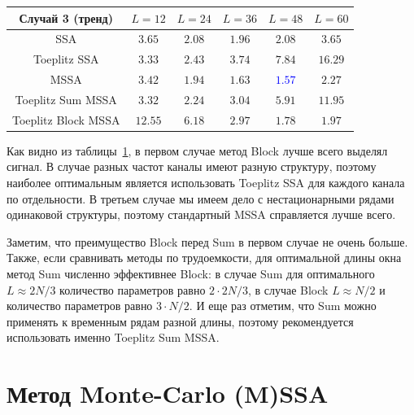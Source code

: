 \documentclass[specialist,
substylefile = spbu_report.rtx,
subf,href,colorlinks=true, 12pt]{disser}
\theoremstyle{definition}
\begin{document}
\begin{table}[h]
\begin{tabular}{cccccc}
			\hhline{======}
			Случай 3 (тренд)                 & $L=12$  & $L=24$                     & $L=36$                     & $L=48$                     & $L=60$          \\
			\hline
			SSA                              & $3.65$  & $2.08$                     & $\mathbf{1.96}$            & $2.08$                     & $3.65$          \\
			\hline
			Toeplitz SSA                     & $3.33$  & $\mathbf{2.43}$            & $3.74$                     & $7.84$                     & $16.29$         \\
			\hline
			MSSA                             & $3.42$  & $1.94$                     & $1.63$                     & \textcolor{blue}{${\mathbf{1.57}}$} & $2.27$          \\
			\hline
			Toeplitz Sum MSSA                & $3.32$  & $\mathbf{2.24}$            & $3.04$                     & $5.91$                     & $11.95$         \\
			\hline
			Toeplitz Block MSSA              & $12.55$ & $6.18$                     & $2.97$                     & $\mathbf{1.78}$            & $1.97$          \\
			\hline
		\end{tabular}
	\label{tab:mse}
\end{table}

Как видно из таблицы~\ref{tab:mse}, в первом случае метод Block лучше всего выделял сигнал. В случае разных частот каналы имеют разную структуру, поэтому наиболее оптимальным является использовать Toeplitz SSA для каждого канала по отдельности.  В третьем случае мы имеем дело с нестационарными рядами одинаковой структуры, поэтому стандартный MSSA справляется лучше всего.

Заметим, что преимущество Block перед Sum в первом случае не очень больше. Также, если сравнивать методы по трудоемкости, для оптимальной длины окна метод Sum численно эффективнее Block: в случае Sum для оптимального $L\approx 2N/3$ количество параметров равно $2\cdot 2N/3$, в случае Block $L\approx N/2$ и количество параметров равно $3 \cdot N/2$. И еще раз отметим, что Sum можно применять к временным рядам разной длины, поэтому рекомендуется использовать именно Toeplitz Sum MSSA.

\chapter{Метод Monte-Carlo (M)SSA}\label{chpt:mc-ssa}
\end{document}
